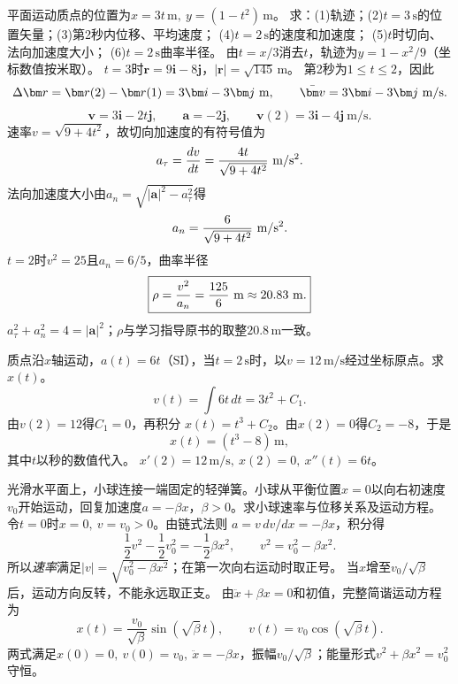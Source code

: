 
\problemtext 平面运动质点的位置为$x=3t\,\mathrm m,\ y=(1-t^2)\,\mathrm m$。
求：(1)轨迹；(2)$t=3\,\mathrm s$的位置矢量；(3)第2秒内位移、平均速度；
(4)$t=2\,\mathrm s$的速度和加速度；
(5)$t$时切向、法向加速度大小；
(6)$t=2\,\mathrm s$曲率半径。
\workings
由$t=x/3$消去$t$，轨迹为$y=1-x^2/9$（坐标数值按米取）。
$t=3$时$\bm r=9\bm i-8\bm j$，$|\bm r|=\sqrt{145}\,\mathrm m$。
第2秒为$1\le t\le2$，因此
\[
\Delta\bm r=\bm r(2)-\bm r(1)=3\bm i-3\bm j\ {\rm m},
\qquad \bar{\bm v}=3\bm i-3\bm j\ {\rm m/s}.
\]
\[
\bm v=3\bm i-2t\bm j,\qquad
\bm a=-2\bm j,\qquad
\bm v(2)=3\bm i-4\bm j\ \mathrm{m/s}.
\]
速率$v=\sqrt{9+4t^2}$，故切向加速度的有符号值为
\[
a_\tau=\frac{dv}{dt}=\frac{4t}{\sqrt{9+4t^2}}\ {\rm m/s^2}.
\]
法向加速度大小由$a_n=\sqrt{|\bm a|^2-a_\tau^2}$得
\[
a_n=\frac{6}{\sqrt{9+4t^2}}\ {\rm m/s^2}.
\]
$t=2$时$v^2=25$且$a_n=6/5$，曲率半径
\[
\boxed{\rho=\frac{v^2}{a_n}=\frac{125}{6}\ {\rm m}\approx20.83\ {\rm m}.}
\]
\crosscheck $a_\tau^2+a_n^2=4=|\bm a|^2$；$\rho$与学习指导原书的取整$20.8\,\mathrm m$一致。

\problemtext 质点沿$x$轴运动，$a(t)=6t$（SI），当$t=2\,\mathrm s$时，以$v=12\,\mathrm{m/s}$经过坐标原点。求$x(t)$。
\workings
\[
v(t)=\int6t\,dt=3t^2+C_1.
\]
由$v(2)=12$得$C_1=0$，再积分
$x(t)=t^3+C_2$。由$x(2)=0$得$C_2=-8$，于是
\[
\boxed{x(t)=(t^3-8)\,\mathrm m,}
\]
其中$t$以秒的数值代入。
\crosscheck $x'(2)=12\,\mathrm{m/s},\ x(2)=0,\ x''(t)=6t$。

\problemtext 光滑水平面上，小球连接一端固定的轻弹簧。小球从平衡位置$x=0$以向右初速度$v_0$开始运动，回复加速度$a=-\beta x$，$\beta>0$。求小球速率与位移关系及运动方程。
\workings
令$t=0$时$x=0,\ v=v_0>0$。由链式法则
$a=v\,dv/dx=-\beta x$，积分得
\[
\frac12v^2-\frac12v_0^2=-\frac12\beta x^2,
\qquad
v^2=v_0^2-\beta x^2.
\]
所以\emph{速率}满足$|v|=\sqrt{v_0^2-\beta x^2}$；在第一次向右运动时取正号。
当$x$增至$v_0/\sqrt\beta$后，运动方向反转，不能永远取正支。
由$\ddot x+\beta x=0$和初值，完整简谐运动方程为
\[
\boxed{x(t)=\frac{v_0}{\sqrt\beta}\sin(\sqrt\beta\,t),\qquad
v(t)=v_0\cos(\sqrt\beta\,t).}
\]
\crosscheck 两式满足$x(0)=0,\ v(0)=v_0,\ \ddot x=-\beta x$，振幅$v_0/\sqrt\beta$；能量形式$v^2+\beta x^2=v_0^2$守恒。

